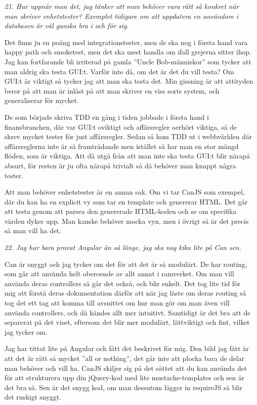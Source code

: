 \documentclass[11pt]{article}
\begin{document}
\emph{21. Hur uppnår man det, jag tänker att man behöver vara rätt så konkret när man skriver enhetstester? Exemplet tidigare om att uppdatera en användare i databasen är väl ganska bra i och för sig.}

Det finns ju en poäng med integrationstester, men de ska nog i första hand vara happy path och smoketest, men det ska mest handla om ifall grejerna sitter ihop. Jag kan fortfarande bli irriterad på gamla ”Uncle Bob-människor” som tycker att man aldrig ska testa GUI:t. Varför inte då, om det är det du vill testa? Om GUI:t är viktigt så tycker jag att man ska testa det. Min gissning är att attityden beror på att man är inlåst på att man skriver en viss sorts system, och generaliserar för mycket.

De som började skriva TDD en gång i tiden jobbade i första hand i finansbranchen, där var GUI:t oviktigt och affärsregler oerhört viktiga, så de skrev mycket tester för just affärsregler. Sedan så kom TDD ut i webbvärlden där affärsreglerna inte är så framträdande men istället så har man en stor mängd flöden, som är viktiga. Att då utgå från att man inte ska testa GUI:t blir närapå absurt, för resten är ju ofta närapå trivialt så då behöver man knappt några tester.

Att man behöver enhetstester är en annan sak. Om vi tar CanJS som exempel, där du kan ha en explicit vy som tar en template och genererar HTML. Det går att testa genom att parsea den genererade HTML-koden och se om specifika värden dyker upp. Man kanske behöver mocka vyn, men i övrigt så är det precis så man vill ha det.

\emph{22. Jag har bara provat Angular än så länge, jag ska nog kika lite på Can sen.}

Can är snyggt och jag tycker om det för att det är så modulärt. De har routing, som går att använda helt oberoende av allt annat i ramverket. Om man vill använda deras controllers så går det också, och blir enkelt. Det tog lite tid för mig att förstå deras dokumentation därför att när jag läste om deras routing så tog det ett tag att komma till avsnittet om hur man gör om man även vill använda controllers, och då kändes allt mer intuitivt. Samtidigt är det bra att de separerat på det viset, eftersom det blir mer modulärt, lättviktigt och fint, vilket jag tycker om.

Jag har tittat lite på Angular och fått det beskrivet för mig. Den bild jag fått är att det är rätt så mycket ”all or nothing”, det går inte att plocka bara de delar man behöver och vill ha. CanJS skiljer sig på det sättet att du kan använda det för att strukturera upp din jQuery-kod med lite mustache-templates och sen är det bra så. Sen är det snygg kod, om man dessutom lägger in requireJS så blir det ruskigt snyggt.
\end{document}
